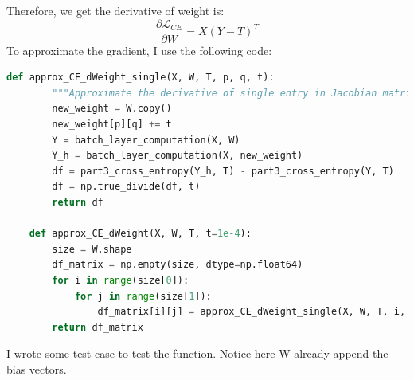 \documentclass[12pt]{article}
\begin{document}
Therefore, we get the derivative of weight is:
\[
    \frac{\partial \mathcal{L}_{CE}}{\partial W} = X(Y-T)^T
\]
To approximate the gradient, I use the following code:
\begin{lstlisting}[language=Python]
    def approx_CE_dWeight_single(X, W, T, p, q, t):
        """Approximate the derivative of single entry in Jacobian matrix"""
        new_weight = W.copy()
        new_weight[p][q] += t
        Y = batch_layer_computation(X, W)
        Y_h = batch_layer_computation(X, new_weight)
        df = part3_cross_entropy(Y_h, T) - part3_cross_entropy(Y, T)
        df = np.true_divide(df, t)
        return df

    def approx_CE_dWeight(X, W, T, t=1e-4):
        size = W.shape
        df_matrix = np.empty(size, dtype=np.float64)
        for i in range(size[0]):
            for j in range(size[1]):
                df_matrix[i][j] = approx_CE_dWeight_single(X, W, T, i, j, t)
        return df_matrix
\end{lstlisting}
I wrote some test case to test the function. Notice here W already append the bias vectors.
\end{document}

